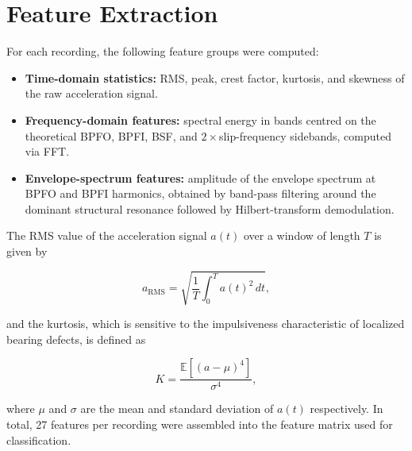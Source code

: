 \section{Feature Extraction}
For each recording, the following feature groups were computed:

\begin{itemize}
  \item \textbf{Time-domain statistics:} RMS, peak, crest factor, kurtosis, and skewness of the
        raw acceleration signal.
  \item \textbf{Frequency-domain features:} spectral energy in bands centred on the theoretical
        BPFO, BPFI, BSF, and $2\times$slip-frequency sidebands, computed via FFT.
  \item \textbf{Envelope-spectrum features:} amplitude of the envelope spectrum at BPFO and BPFI
        harmonics, obtained by band-pass filtering around the dominant structural resonance
        followed by Hilbert-transform demodulation.
\end{itemize}

The RMS value of the acceleration signal $a(t)$ over a window of length $T$ is given by

\begin{equation}
  a_{\mathrm{RMS}} = \sqrt{\frac{1}{T}\int_{0}^{T} a(t)^2 \, dt},
  \label{eq:rms}
\end{equation}

and the kurtosis, which is sensitive to the impulsiveness characteristic of localized bearing
defects, is defined as

\begin{equation}
  K = \frac{\mathbb{E}\left[(a - \mu)^4\right]}{\sigma^4},
  \label{eq:kurtosis}
\end{equation}

\noindent where $\mu$ and $\sigma$ are the mean and standard deviation of $a(t)$ respectively.
In total, 27 features per recording were assembled into the feature matrix used for
classification.
